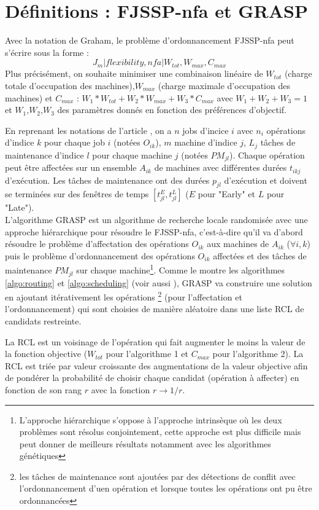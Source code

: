 \documentclass[10pt,a4paper]{scrartcl}
\begin{document}
\section{Définitions : FJSSP-nfa et GRASP}

Avec la notation de Graham, le problème d'ordonnancement FJSSP-nfa peut s'écrire sous la forme : 
\[J_{m}|flexibility,nfa|W_{tot},W_{max},C_{max}\]
Plus précisément, on souhaite minimiser une combinaison linéaire de $W_{tot}$ (charge totale
d'occupation des machines),$W_{max}$ (charge maximale
d'occupation des machines) et $C_{max}$ :
$W_1*W_{tot}+W_2*W_{max}+W_3*C_{max}$ avec $W_1+W_2+W_3=1$ et $W_1$,$W_2$,$W_3$ des paramètres
donnés en fonction des préférences d'objectif.

En reprenant les notations de l'article \cite{GRASP}, on a $n$ jobs d'incice $i$
avec $n_{i}$ opérations d'indice $k$ pour chaque job $i$ (notées $O_{ik}$), $m$ machine d'indice $j$, $L_{j}$ tâches de maintenance d'indice $l$ pour chaque machine $j$ (notées $PM_{jl}$). Chaque opération
peut être affectées sur un ensemble $A_{ik}$ de machines avec différentes durées $t_{ikj}$
d'exécution. Les tâches de maintenance ont des durées $p_{jl}$ d'exécution et doivent se terminées
sur des fenêtres de temps $[t^{E}_{jl},t^{L}_{jl}]$ ($E$ pour "Early" et $L$ pour "Late"). \\

L'algorithme GRASP est un algorithme de recherche locale randomisée avec une approche hiérarchique
pour résoudre le FJSSP-nfa, c'est-à-dire qu'il va d'abord résoudre le problème d'affectation
des opérations $O_{ik}$ aux machines de $A_{ik}$ ($\forall i,k$) puis le problème d'ordonnancement
des opérations $O_{ik}$ affectées et des tâches de maintenance  $PM_{jl}$ sur chaque machine\footnote{L'approche
hiérarchique s'oppose à l'approche intrinsèque où les deux problèmes sont résolus conjointement, cette approche
est plus difficile mais peut donner de meilleurs résultats notamment avec les algorithmes génétiques}.
Comme le montre les algorithmes \ref{algo:routing} et \ref{algo:scheduling} (voir aussi \cite{GRASP}), GRASP va construire
une solution en ajoutant itérativement les opérations \footnote{les tâches de maintenance sont ajoutées par des
détections de conflit avec l'ordonnancement d'uen opération et lorsque toutes les opérations ont pu être ordonnancées}
 (pour l'affectation et l'ordonnancement) qui sont choisies de manière
aléatoire dans une liste RCL de candidats restreinte. 

La RCL est un voisinage de l'opération qui fait augmenter le moins
la valeur de la fonction objective ($W_{tot}$ pour l'algorithme 1 et $C_{max}$ pour l'algorithme 2). La RCL est triée par valeur croissante des augmentations de la valeur objective
afin de pondérer la probabilité de choisir chaque candidat (opération à affecter) en fonction de son rang $r$
avec la fonction $r \rightarrow 1/r$.
\end{document}
